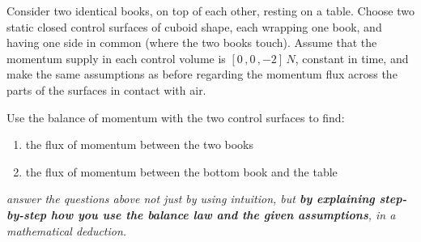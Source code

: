 \documentclass[a4paper,12pt,%
onecolumn,oneside,%
british%
]{memoir}
\renewcommand*{\|}[1][]{\nonscript\:#1\vert\nonscript\:\mathopen{}}
\begin{document}
%
\begin{exercise}[label={ex:twobooks}]
  Consider two identical books, on top of each other, resting on a table. Choose two static closed control surfaces of cuboid shape, each wrapping one book, and having one side in common (where the two books touch). Assume that the momentum supply in each control volume is $[0\,,0\,,\num{-2}]\,\unit{N}$, constant in time, and make the same assumptions as before regarding the momentum flux across the parts of the surfaces in contact with air.

  Use the balance of momentum with the two control surfaces to find:
\begin{enumerate}[exerc]
\item the flux of momentum between the two books
\item the flux of momentum between the bottom book and the table
\end{enumerate}
  {\itshape answer the questions above not just by using intuition, but \textbf{by explaining step-by-step how you use the balance law and the given assumptions}, in a mathematical deduction.}
\end{exercise}
\end{document}
